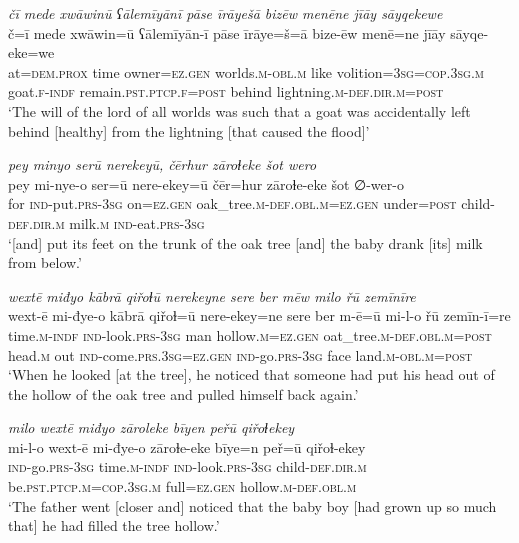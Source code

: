 \ea \label{ZB.42}
\textit{čī mede xwāwinū ʕālemīyānī pāse īrāyešā bizēw menēne jīāy sāyqekewe} \\ 
\gll č=ī mede xwāwin=ū ʕālemīyān-ī pāse īrāye=š=ā bize-ēw menē=ne jīāy sāyqe-eke=we \\ 
 at=\textsc{dem.prox} time owner\textsc{\textsc{=ez.gen}} worlds\textsc{.m}\textsc{-obl}\textsc{.m} like volition\textsc{=3sg}\textsc{=cop}\textsc{.3sg}\textsc{.m} goat\textsc{.f}\textsc{-indf} remain\textsc{.pst}\textsc{.ptcp}\textsc{.f}\textsc{=\textsc{post}} behind lightning\textsc{.m}\textsc{-def}\textsc{.dir}\textsc{.m}\textsc{=\textsc{post}} \\ 
\glt `The will of the lord of all worlds was such that a goat was accidentally left behind [healthy] from the lightning [that caused the flood]'
\z 
 
\ea \label{ZB.45}
\textit{pey minyo serū nerekeyū, čērhur zāroɫeke šot wero} \\ 
\gll pey mi-nye-o ser=ū nere-ekey=ū čēr=hur zāroɫe-eke šot ∅-wer-o \\ 
 for \textsc{ind-}put\textsc{.prs}\textsc{-3sg} on\textsc{\textsc{=ez.gen}} oak\_tree\textsc{.m}\textsc{-def}\textsc{.obl}\textsc{.m}\textsc{\textsc{=ez.gen}} under\textsc{=\textsc{post}} child\textsc{-def}\textsc{.dir}\textsc{.m} milk\textsc{.m} \textsc{ind-}eat\textsc{.prs}\textsc{-3sg} \\ 
\glt `[and] put its feet on the trunk of the oak tree [and] the baby drank [its] milk from below.'
\z 
 
\ea \label{ZB.48}
\textit{wextē miđyo kābrā qiřoɫū nerekeyne sere ber mēw milo řū zemīnīre} \\ 
\gll wext-ē mi-đye-o kābrā qiřoɫ=ū nere-ekey=ne sere ber m-ē=ū mi-l-o řū zemīn-ī=re \\ 
 time\textsc{.m}\textsc{-indf} \textsc{ind-}look\textsc{.prs}\textsc{-3sg} man hollow\textsc{.m}\textsc{\textsc{=ez.gen}} oat\_tree\textsc{.m}\textsc{-def}\textsc{.obl}\textsc{.m}\textsc{=\textsc{post}} head\textsc{.m} out \textsc{ind-}come\textsc{.prs}\textsc{.3sg}\textsc{\textsc{=ez.gen}} \textsc{ind-}go\textsc{.prs}\textsc{-3sg} face land\textsc{.m}\textsc{-obl}\textsc{.m}\textsc{=\textsc{post}} \\ 
\glt `When he looked [at the tree], he noticed that someone had put his head out of the hollow of the oak tree and pulled himself back again.'
\z 
 
\ea \label{ZB.49}
\textit{milo wextē miđyo zāroleke bīyen peřū qiřoɫekey} \\ 
\gll mi-l-o wext-ē mi-đye-o zāroɫe-eke bīye=n peř=ū qiřoɫ-ekey \\ 
 \textsc{ind-}go\textsc{.prs}\textsc{-3sg} time\textsc{.m}\textsc{-indf} \textsc{ind-}look\textsc{.prs}\textsc{-3sg} child\textsc{-def}\textsc{.dir}\textsc{.m} be\textsc{.pst}\textsc{.ptcp}\textsc{.m}\textsc{=cop}\textsc{.3sg}\textsc{.m} full\textsc{\textsc{=ez.gen}} hollow\textsc{.m}\textsc{-def}\textsc{.obl}\textsc{.m} \\ 
\glt `The father went [closer and] noticed that the baby boy [had grown up so much that] he had filled the tree hollow.'
\z 
 
